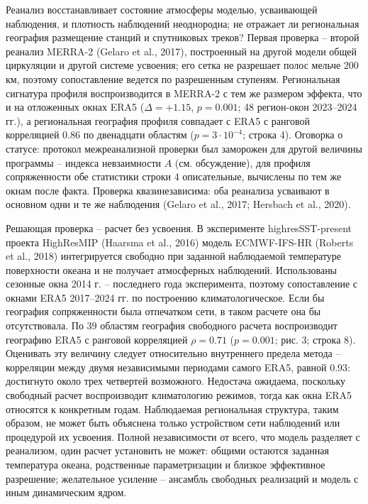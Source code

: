 \documentclass[12pt,a4paper]{article}
\begin{document}
Реанализ восстанавливает состояние атмосферы моделью, усваивающей наблюдения, и плотность наблюдений неоднородна; не отражает ли региональная география размещение станций и спутниковых треков? Первая проверка -- второй реанализ MERRA-2 (Gelaro et al., 2017), построенный на другой модели общей циркуляции и другой системе усвоения; его сетка не разрешает полос мельче 200 км, поэтому сопоставление ведется по разрешенным ступеням. Региональная сигнатура профиля воспроизводится в MERRA-2 с тем же размером эффекта, что и на отложенных окнах ERA5 ($\Delta = +1.15$, $p = 0.001$; 48 регион-окон 2023--2024 гг.), а региональная география профиля совпадает с ERA5 с ранговой корреляцией 0.86 по двенадцати областям ($p = 3 \cdot 10^{-4}$; строка 4). Оговорка о статусе: протокол межреанализной проверки был заморожен для другой величины программы -- индекса невзаимности $A$ (см. обсуждение), для профиля сопряженности обе статистики строки 4 описательные, вычислены по тем же окнам после факта. Проверка квазинезависима: оба реанализа усваивают в основном одни и те же наблюдения (Gelaro et al., 2017; Hersbach et al., 2020).

Решающая проверка -- расчет без усвоения. В эксперименте highresSST-present проекта HighResMIP (Haarsma et al., 2016) модель ECMWF-IFS-HR (Roberts et al., 2018) интегрируется свободно при заданной наблюдаемой температуре поверхности океана и не получает атмосферных наблюдений. Использованы сезонные окна 2014 г. -- последнего года эксперимента, поэтому сопоставление с окнами ERA5 2017--2024 гг. по построению климатологическое. Если бы география сопряженности была отпечатком сети, в таком расчете она бы отсутствовала. По 39 областям география свободного расчета воспроизводит географию ERA5 с ранговой корреляцией $\rho = 0.71$ ($p = 0.001$; рис. 3; строка 8). Оценивать эту величину следует относительно внутреннего предела метода -- корреляции между двумя независимыми периодами самого ERA5, равной 0.93: достигнуто около трех четвертей возможного. Недостача ожидаема, поскольку свободный расчет воспроизводит климатологию режимов, тогда как окна ERA5 относятся к конкретным годам. Наблюдаемая региональная структура, таким образом, не может быть объяснена только устройством сети наблюдений или процедурой их усвоения. Полной независимости от всего, что модель разделяет с реанализом, один расчет установить не может: общими остаются заданная температура океана, родственные параметризации и близкое эффективное разрешение; желательное усиление -- ансамбль свободных реализаций и модель с иным динамическим ядром.
\end{document}

